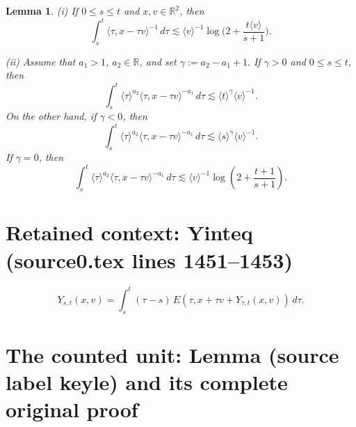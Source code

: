 \documentclass[10pt,a4paper]{amsart}
\def\R{{\mathbb R}}
\theoremstyle{plain}
\newtheorem{lemma}[theorem]{Lemma}
\begin{document}
	\begin{lemma}\label{z216}
		(i) If $0\le s\le t$ and $x,v\in\R^2$, then
		\begin{equation*}
			\int_s^t \langle\tau,x-\tau v\rangle^{-1}\,d\tau
			\lesssim
			\langle v\rangle^{-1}\log\!\Big(2+\frac{t\langle v\rangle}{s+1}\Big).
		\end{equation*}
		
		(ii) Assume that $a_1>1$, $a_2\in\mathbb R$, and set
			$\gamma:=a_2-a_1+1.$
	 If $\gamma>0$ and $0\leq s\leq t$, then
		\begin{equation}\label{z210}
			\int_s^t\langle\tau\rangle^{a_2}\langle\tau,x-\tau v\rangle^{-a_1}\,d\tau\lesssim\langle t\rangle^{\gamma}
			\langle v\rangle^{-1}.
		\end{equation}
		On the other hand, if $\gamma<0$, then \begin{equation}\label{z212}
			\int_s^t
			\langle\tau\rangle^{a_2}
			\langle\tau,x-\tau v\rangle^{-a_1}\,d\tau
			\lesssim
			\langle s\rangle^{\gamma}
			\langle v\rangle^{-1}.
		\end{equation}
	If $\gamma=0$, then
		\begin{equation}\label{z212-borderline}
			\int_s^t\langle\tau\rangle^{a_2}
			\langle\tau,x-\tau v\rangle^{-a_1}\,d\tau
			\lesssim\langle v\rangle^{-1}
			\log\!\left(2+\frac{t+1}{s+1}\right).
		\end{equation}
	\end{lemma}


\section*{Retained context: Yinteq (source0.tex lines 1451--1453)}

	\begin{equation}\label{Yinteq}
	Y_{s,t}(x,v)=\int_s^t(\tau-s)\,E(\tau,x+\tau v+Y_{\tau,t}(x,v))\,d\tau.
	\end{equation}


\section{The counted unit: Lemma (source label keyle) and its complete original proof}
\end{document}
